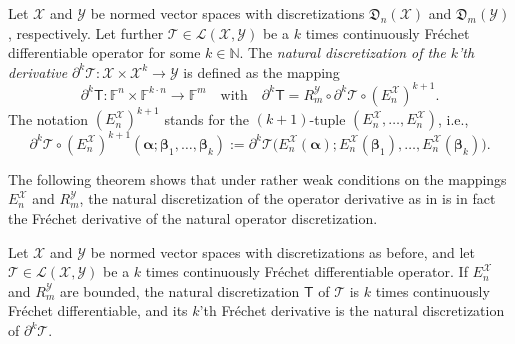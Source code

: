 \documentclass[a4paper]{paper}
\newcommand{\Discr}{\mathfrak{D}}
\newcommand{\VecSpace}[1]{\mathscr{#1}}
\newcommand{\Field}{\mathbb{F}}
\newcommand{\Natural}{\mathbb{N}}
\newcommand{\Op}[1]{\mathcal{#1}}
\newcommand{\DiscOp}[1]{\mathsf{#1}}
\newcommand*{\EXT}[2]{\ensuremath{E_{#1}^{#2}}}
\newcommand*{\REST}[2]{\ensuremath{R_{#1}^{#2}}}
\newcommand*{\RmY}{\ensuremath{\REST{m}{\VecSpace{Y}}}}
\newcommand*{\EnX}{\ensuremath{\EXT{n}{\VecSpace{X}}}}
\newcommand{\valpha}{\boldsymbol{\alpha}}
\newcommand{\vbeta}{\boldsymbol{\beta}}
\begin{document}
\begin{definition}
 \label{def:derivative_discretization}
 Let $\VecSpace{X}$ and $\VecSpace{Y}$ be normed vector spaces with discretizations $\Discr_n(\VecSpace{X})$ and $\Discr_m(\VecSpace{Y})$, 
 respectively. Let further $\Op{T} \in \VecSpace{L}(\VecSpace{X}, \VecSpace{Y})$ be a $k$ times continuously Fr\'{e}chet differentiable 
 operator for some $k \in  \Natural$. The \emph{natural discretization of the $k$'th derivative} 
 $ \partial^k \Op{T} \colon \VecSpace{X} \times \VecSpace{X}^k \to \VecSpace{Y}$ is defined as the mapping
 \begin{equation*}
  \partial^k \DiscOp{T} \colon \Field^n \times \Field^{k\cdot n} \to \Field^m
  \quad \text{with} \quad
  \partial^k \DiscOp{T} = \RmY \circ \partial^k \Op{T} \circ (\EnX)^{k+1}.
 \end{equation*}
 The notation $(\EnX)^{k+1}$ stands for the $(k+1)$-tuple $(\EnX, \ldots, \EnX)$, i.e., 
 \begin{equation*}
  \partial^k \Op{T} \circ (\EnX)^{k+1}(\valpha; \vbeta_1, \ldots, \vbeta_k) :=
 \partial^k \Op{T}\big( \EnX(\valpha); \EnX(\vbeta_1), \ldots, \EnX(\vbeta_k) \big).
 \end{equation*}
\end{definition}


The following theorem shows that under rather weak conditions on the mappings $E_n^{\VecSpace{X}}$ and $R_m^{\VecSpace{Y}}$, the natural 
discretization of the operator derivative as in  is in fact the Fr\'{e}chet derivative of the natural 
operator discretization.

\begin{theorem}
 Let $\VecSpace{X}$ and $\VecSpace{Y}$ be normed vector spaces with discretizations as before, and let 
 $\Op{T} \in \VecSpace{L}(\VecSpace{X}, \VecSpace{Y})$ be a $k$ times continuously Fr\'{e}chet differentiable 
 operator. If $E_n^{\VecSpace{X}}$ and $R_m^{\VecSpace{Y}}$ are bounded, the natural discretization $\DiscOp{T}$ of $\Op{T}$ is 
$k$ times  continuously Fr\'{e}chet differentiable, and its $k$'th Fr\'{e}chet derivative is the natural discretization of 
$\partial^k\Op{T}$.
\end{theorem}
\end{document}
